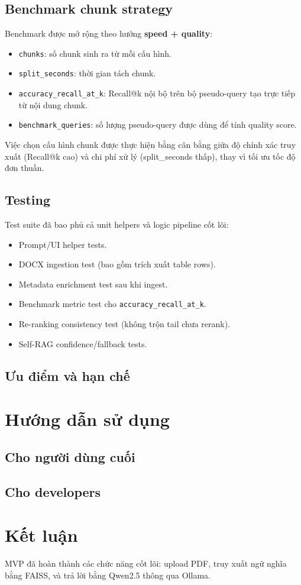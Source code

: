 \documentclass[12pt,a4paper]{article}
\begin{document}
\subsection{Benchmark chunk strategy}
Benchmark được mở rộng theo hướng \textbf{speed + quality}:
\begin{itemize}
	\item \texttt{chunks}: số chunk sinh ra từ mỗi cấu hình.
	\item \texttt{split\_seconds}: thời gian tách chunk.
	\item \texttt{accuracy\_recall\_at\_k}: Recall@k nội bộ trên bộ pseudo-query tạo trực tiếp từ nội dung chunk.
	\item \texttt{benchmark\_queries}: số lượng pseudo-query được dùng để tính quality score.
\end{itemize}

Việc chọn cấu hình chunk được thực hiện bằng cân bằng giữa độ chính xác truy xuất (Recall@k cao) và chi phí xử lý (split\_seconds thấp), thay vì tối ưu tốc độ đơn thuần.

\subsection{Testing}
Test suite đã bao phủ cả unit helpers và logic pipeline cốt lõi:
\begin{itemize}
	\item Prompt/UI helper tests.
	\item DOCX ingestion test (bao gồm trích xuất table rows).
	\item Metadata enrichment test sau khi ingest.
	\item Benchmark metric test cho \texttt{accuracy\_recall\_at\_k}.
	\item Re-ranking consistency test (không trộn tail chưa rerank).
	\item Self-RAG confidence/fallback tests.
\end{itemize}

\subsection{Ưu điểm và hạn chế}

\section{Hướng dẫn sử dụng}
\subsection{Cho người dùng cuối}
\subsection{Cho developers}

\section{Kết luận}
MVP đã hoàn thành các chức năng cốt lõi: upload PDF, truy xuất ngữ nghĩa bằng FAISS, và trả lời bằng Qwen2.5 thông qua Ollama.
\end{document}
